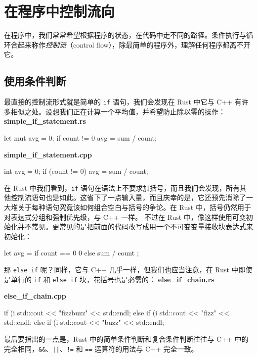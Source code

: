 \section{在程序中控制流向}
\label{idx:idx_3694a8d9}
在程序中，我们常常希望根据程序的状态，在代码中走不同的路径。条件执行与循环合起来称作\emph{控制流}（control flow），除最简单的程序外，理解任何程序都离不开它。
\subsection{使用条件判断}
\label{idx:idx_cbdbb6a9}
最直接的控制流形式就是简单的 \texttt{if} 语句，我们会发现在 Rust 中它与 C++ 有许多相似之处。设想我们正在计算一个平均值，并希望防止除以零的操作：
\textbf{simple\_\allowbreak{}if\_\allowbreak{}statement.\allowbreak{}rs}
\begin{codebox}[rust]
let mut avg = 0;
if count != 0 {
    avg = sum / count;
}
\end{codebox}
\textbf{simple\_\allowbreak{}if\_\allowbreak{}statement.\allowbreak{}cpp}
\begin{codebox}[text]
int avg = 0;
if (count != 0) {
    avg = sum / count;
}
\end{codebox}
在 Rust 中我们看到，\texttt{if} 语句在语法上不要求加括号，而且我们会发现，所有其他控制流语句也是如此。这省下了一点输入量，而且庆幸的是，它还预先消除了一大堆关于每种语句究竟该如何组合空白与括号的争论。在 Rust 中，括号仍然用于对表达式分组和强制优先级，与 C++ 一样。
不过在 Rust 中，像这样使用可变初始化并不常见。更常见的是把前面的代码改写成用一个不可变变量接收块表达式来初始化：
\begin{codebox}[rust]
let avg = if count == 0 { 0 } else { sum / count };
\end{codebox}
\label{idx:idx_faa429fa}
那 \texttt{else if} 呢？同样，它与 C++ 几乎一样，但我们也应当注意，在 Rust 中即使是单行的 \texttt{if} 和 \texttt{else if} 块，花括号也是必需的：
\textbf{else\_\allowbreak{}if\_\allowbreak{}chain.\allowbreak{}rs}
\textbf{else\_\allowbreak{}if\_\allowbreak{}chain.\allowbreak{}cpp}
\begin{codebox}[rust]
if (i %
    std::cout << "fizzbuzz" << std::endl;
else if (i %
    std::cout << "fizz" << std::endl;
else if (i %
    std::cout << "buzz" << std::endl;
\end{codebox}
最后要指出的一点是，Rust 中的简单条件判断和复合条件判断往往与 C++ 中的完全相同，\texttt{\&\&}、\texttt{||}、\texttt{!=} 和 \texttt{==} 运算符的用法与 C++ 完全一致。
